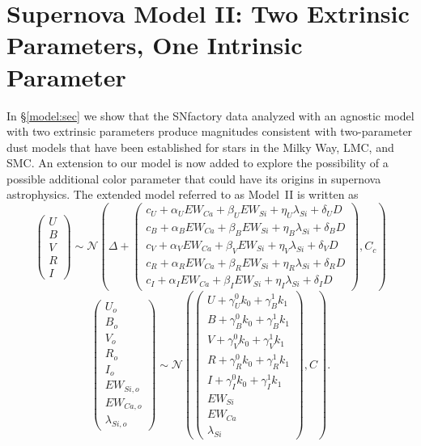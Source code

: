 \documentclass{aastex61}   	%
\begin{document}
\section{Supernova Model II: Two Extrinsic Parameters, One Intrinsic Parameter}
\label{model2:sec}
In \S\ref{model:sec} we show that the SNfactory data analyzed with an agnostic model with
two extrinsic parameters produce
magnitudes consistent
with two-parameter dust models that have been established for stars in the Milky Way, LMC, and SMC.
An extension to our model is now added to explore the possibility of
a possible additional
color parameter that could have its origins in supernova astrophysics.
The extended model referred to as Model~II is written as
\begin{equation}
\begin{pmatrix}
U\\B\\V\\R\\I
\end{pmatrix}
\sim \mathcal{N}
\left(
\Delta +
\begin{pmatrix}
c_U+\alpha_U EW_{Ca} + \beta_U EW_{Si} + \eta_U \lambda_{Si} + \delta_U D\\
c_B+\alpha_B EW_{Ca} + \beta_B EW_{Si} + \eta_B \lambda_{Si} + \delta_B D \\
c_V+\alpha_V EW_{Ca} + \beta_V EW_{Si} + \eta_V \lambda_{Si} + \delta_V D\\
c_R+\alpha_R EW_{Ca} + \beta_R EW_{Si} + \eta_R \lambda_{Si} + \delta_R D\\
c_I+\alpha_I EW_{Ca} + \beta_I EW_{Si}+ \eta_I \lambda_{Si} + \delta_I D
\end{pmatrix}
,C_{c}
\right)
\label{ewsiv:eqn}
\end{equation}
\begin{equation}
\begin{pmatrix}
U_o\\B_o\\ V_o\\R_o\\I_o\\EW_{Si, o}\\ EW_{Ca, o} \\ \lambda_{Si, o}
\end{pmatrix}
\sim \mathcal{N}
\left(
\begin{pmatrix}
U +\gamma^0_{U} k_0 +\gamma^1_{B} k_1 \\B +\gamma^0_{B} k_0 +\gamma^1_{B} k_1 \\
V+\gamma^0_{V} k_0+\gamma^1_{V} k_1\\R+\gamma^0_{R} k_0 + \gamma^1_{R} k_1\\I+\gamma^0_{I} k_0+\gamma^1_{I} k_1\\
EW_{Si}\\ EW_{Ca} \\ \lambda_{Si}
\end{pmatrix}
,C
\right).
\label{dust:eqn}
\end{equation}
\end{document}
